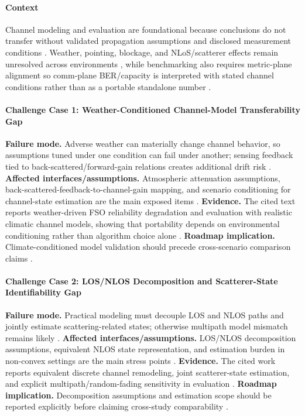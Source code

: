 \documentclass[letterpaper,journal]{IEEEtran}
\begin{document}
\paragraph{Context}
Channel modeling and evaluation are foundational because conclusions do not transfer without validated propagation assumptions and disclosed measurement conditions \cite{O_ISAC_005, O_ISAC_327}. Weather, pointing, blockage, and NLoS/scatterer effects remain unresolved across environments \cite{O_ISAC_005, O_ISAC_050, O_ISAC_327}, while benchmarking also requires metric-plane alignment so comm-plane BER/capacity is interpreted with stated channel conditions rather than as a portable standalone number \cite{O_ISAC_381}.

\paragraph{Challenge Case 1: Weather-Conditioned Channel-Model Transferability Gap}
\textbf{Failure mode.} Adverse weather can materially change channel behavior, so assumptions tuned under one condition can fail under another; sensing feedback tied to back-scattered/forward-gain relations creates additional drift risk \cite{O_ISAC_005}. \textbf{Affected interfaces/assumptions.} Atmospheric attenuation assumptions, back-scattered-feedback-to-channel-gain mapping, and scenario conditioning for channel-state estimation are the main exposed items \cite{O_ISAC_005}. \textbf{Evidence.} The cited text reports weather-driven FSO reliability degradation and evaluation with realistic climatic channel models, showing that portability depends on environmental conditioning rather than algorithm choice alone \cite{O_ISAC_005}. \textbf{Roadmap implication.} Climate-conditioned model validation should precede cross-scenario comparison claims \cite{O_ISAC_005}.

\paragraph{Challenge Case 2: LOS/NLOS Decomposition and Scatterer-State Identifiability Gap}
\textbf{Failure mode.} Practical modeling must decouple LOS and NLOS paths and jointly estimate scattering-related states; otherwise multipath model mismatch remains likely \cite{O_ISAC_050}. \textbf{Affected interfaces/assumptions.} LOS/NLOS decomposition assumptions, equivalent NLOS state representation, and estimation burden in non-convex settings are the main stress points \cite{O_ISAC_050}. \textbf{Evidence.} The cited work reports equivalent discrete channel remodeling, joint scatterer-state estimation, and explicit multipath/random-fading sensitivity in evaluation \cite{O_ISAC_050}. \textbf{Roadmap implication.} Decomposition assumptions and estimation scope should be reported explicitly before claiming cross-study comparability \cite{O_ISAC_050}.
\end{document}
